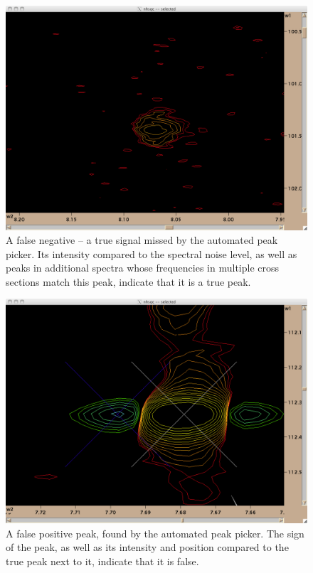 \begin{figure}
  \includegraphics[scale=0.25]{figures/false_negative}
  \caption[A false negative -- a true signal missed by the automated peak picker.]
          {A false negative -- a true signal missed by the automated peak picker.
           Its intensity compared to the spectral noise level, as well as 
           peaks in additional spectra whose frequencies in multiple cross
           sections match this peak, indicate that it is a true peak.}
  \label{false_negative}
\end{figure}

\begin{figure}
  \includegraphics[scale=0.25]{figures/false_positive}
  \caption[A false positive peak, found by the automated peak picker.]
          {A false positive peak, found by the automated peak picker.
           The sign of the peak, as well as its intensity and position
           compared to the true peak next to it, indicate that it is false.}
  \label{false_positive}
\end{figure}

